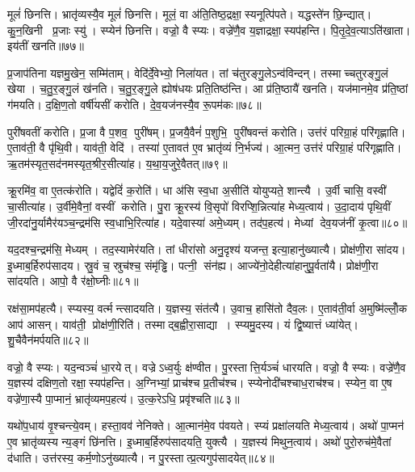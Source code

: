 मूलं॑ छिनत्ति। भ्रातृ॑व्यस्यै॒व मूलं॑ छिनत्ति। मूलं॒ वा अ॑ति॒तिष्ठ॒द्रक्षा॒स्यनूत्पि॑पते। यद्धस्ते॑न छि॒न्द्यात्। कु॒न॒खिनी प्र॒जाः स्यु॑। स्प्येन॑ छिनत्ति। वज्रो॒ वै स्प्यः। वज्रे॑णै॒व य॒ज्ञाद्रक्षा॒स्यप॑हन्ति। पि॒तृ॒दे॒व॒त्याऽति॑खाता। इय॑तीं खनति॥७७॥

प्र॒जाप॑तिना यज्ञमु॒खेन॒ सम्मि॑ताम्। वेदि॑र्दे॒वेभ्यो॒ निला॑यत। तां च॑तुरङ्गु॒लेऽन्व॑विन्दन्। तस्माच्चतुरङ्गु॒लं खेया। च॒तु॒र॒ङ्गु॒लं ख॑नति। च॒तु॒र॒ङ्गु॒ले ह्योष॑धयः प्रति॒तिष्ठ॑न्ति। आ प्र॑ति॒ष्ठायै॑ खनति। यज॑मानमे॒व प्र॑ति॒ष्ठां ग॑मयति। द॒क्षि॒ण॒तो वर्\mbox{}षी॑यसीं करोति। दे॒व॒यज॑नस्यै॒व रू॒पम॑कः॥७८॥

पुरी॑षवतीं करोति। प्र॒जा वै प॒शव॒ पुरी॑षम्। प्र॒जयै॒वैनं॑ प॒शुभि॒ पुरी॑षवन्तं करोति। उत्त॑रं परिग्रा॒हं परि॑गृह्णाति। ए॒ताव॑ती॒ वै पृ॑थि॒वी। याव॑ती॒ वेदि॑। तस्या॑ ए॒तावत॑ ए॒व भ्रातृ॑व्यं नि॒र्भज्य॑। आ॒त्मन॒ उत्त॑रं परिग्रा॒हं परि॑गृह्णाति। ऋ॒तम॑स्यृत॒सद॑नमस्यृत॒श्रीर॒सीत्या॑ह। य॒था॒य॒जुरे॒वैतत्॥७९॥

क्रू॒रमि॑व॒ वा ए॒तत्क॑रोति। यद्वेदिं॑ क॒रोति॑। धा अ॑सि स्व॒धा अ॒सीति॑ योयुप्यते॒ शान्त्यै। उ॒र्वी चासि॒ वस्वी॑ चा॒सीत्या॑ह। उ॒र्वीमे॒वैनां॒ वस्वीं करोति। पु॒रा क्रू॒रस्य॑ वि॒सृपो॑ विरप्शि॒न्नित्या॑ह मेध्य॒त्वाय॑। उ॒दा॒दाय॑ पृथि॒वीं जी॒रदा॑नु॒र्यामैर॑यञ्च॒न्द्रम॑सि स्व॒धाभि॒रित्या॑ह। यदे॒वास्या॑ अमे॒ध्यम्। तद॑प॒हत्य॑। मेध्यां देव॒यज॑नीं कृ॒त्वा॥८०॥

यद॒दश्च॒न्द्रम॑सि॒ मेध्यम्। तद॒स्यामेर॑यति। तां धीरा॑सो अनु॒दृश्य॑ यजन्त॒ इत्या॒हानु॑ख्यात्यै। प्रोक्ष॑णी॒रा सा॑दय। इ॒ध्माब॒र्\mbox{}हिरुप॑सादय। स्रु॒वं च॒ स्रुच॑श्च॒ संमृ॑ड्ढि। पत्नी॒ संन॑ह्य। आज्ये॑नो॒देहीत्या॑हानुपू॒र्वता॑यै। प्रोक्ष॑णी॒रा सा॑दयति। आपो॒ वै र॑क्षो॒घ्नीः॥८१॥

रक्ष॑सा॒मप॑हत्यै। स्प्यस्य॒ वर्त्मन्त्सादयति। य॒ज्ञस्य॒ संत॑त्यै। उ॒वाच॒ हासि॑तो दैव॒लः। ए॒ताव॑ती॒र्वा अ॒मुष्मि॑ल्लोँ॒क आप॑ आसन्। याव॑ती॒ प्रोक्ष॑णी॒रिति॑। तस्माद्ब॒ह्वीरा॒साद्या। स्प्यमु॒दस्य\sn{}। यं द्वि॒ष्यात्तं ध्या॑येत्। शु॒चैवैन॑मर्पयति॥८२॥

वज्रो॒ वै स्प्यः। यद॒न्वञ्चं॑ धा॒रयेत्। वज्रेऽध्व॒र्युः क्ष॑ण्वीत। पु॒रस्तात्ति॒र्यञ्चं॑ धारयति। वज्रो॒ वै स्प्यः। वज्रे॑णै॒व य॒ज्ञस्य॑ दक्षिण॒तो रक्षा॒स्यप॑हन्ति। अ॒ग्निभ्यां॒ प्राच॑श्च प्र॒तीच॑श्च। स्प्येनोदी॑चश्चाध॒राच॑श्च। स्प्येन॒ वा ए॒ष वज्रे॑णा॒स्यै पा॒प्मानं॒ भ्रातृ॑व्यमप॒हत्य॑। उ॒त्क॒रेऽधि॒ प्रवृ॑श्चति॥८३॥

यथो॑प॒धाय॑ वृ॒श्चन्त्ये॒वम्। हस्ता॒वव॑ नेनिक्ते। आ॒त्मान॑मे॒व प॑वयते। स्प्यं प्रक्षा॑लयति मेध्य॒त्वाय॑। अथो॑ पा॒प्मन॑ ए॒व भ्रातृ॑व्यस्य न्य॒ङ्गं छि॑नत्ति। इ॒ध्माब॒र्\mbox{}हिरुप॑सादयति॒ युक्त्यै। य॒ज्ञस्य॑ मिथुन॒त्वाय॑। अथो॑ पुरो॒रुच॑मे॒वैतां द॑धाति। उत्त॑रस्य॒ कर्म॒णोऽनु॑ख्यात्यै। न पु॒रस्तात्प्र॒त्यगुप॑सादयेत्॥८४॥

